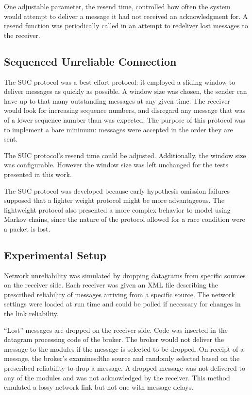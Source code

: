 One adjustable parameter, the resend time, controlled how often the system would attempt to deliver a message it had not received an acknowledgment for.
A resend function was periodically called in an attempt to redeliver lost messages to the receiver.

\subsection{Sequenced Unreliable Connection}
The SUC protocol was a best effort protocol: it employed a sliding window to deliver messages as quickly as possible.
A window size was chosen, the sender can have up to that many outstanding messages at any given time.
The receiver would look for increasing sequence numbers, and disregard any message that was of a lower sequence number than was expected.
The purpose of this protocol was to implement a bare minimum: messages were accepted in the order they are sent.

The SUC protocol's resend time could be adjusted. 
Additionally, the window size was configurable. 
However the window size was left unchanged for the tests presented in this work.

The SUC protocol was developed because early hypothesis omission failures supposed that a lighter weight protocol might be more advantageous.
The lightweight protocol also presented a more complex behavior to model using Markov chains, since the nature of the protocol allowed for a race condition were a packet is lost.

\subsection{Experimental Setup}
Network unreliability was simulated by dropping datagrams from specific sources on the receiver side.
Each receiver was given an XML file describing the prescribed reliability of messages arriving from a specific source.
The network settings were loaded at run time and could be polled if necessary for changes in the link reliability.

``Lost'' messages are dropped on the receiver side. 
Code was inserted in the datagram processing code of the broker.
The broker would not deliver the message to the modules if the message is selected to be dropped.
On receipt of a message, the broker's examinesdthe source and randomly selected based on the prescribed reliability to drop a message.
A dropped message was not delivered to any of the modules and was not acknowledged by the receiver.
This method emulated a lossy network link but not one with message delays.

